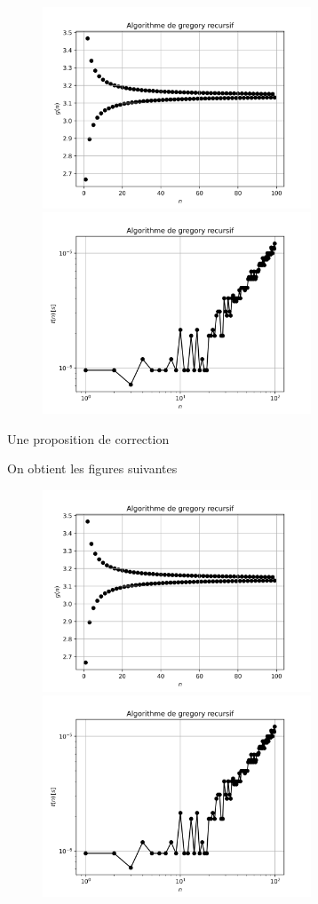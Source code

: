 \documentclass[a4paper,12pt]{article}
\begin{document}
\begin{figure}[htbp]
\includegraphics[width=8cm]{./2024/greg-val.png}
\includegraphics[width=8cm]{./2024/greg-tim.png}
\end{figure}
\clearpage
Une proposition de correction

\clearpage
On obtient les figures suivantes
\begin{figure}[htbp]
\includegraphics[width=8cm]{./2024/greg-val.png}
\includegraphics[width=8cm]{./2024/greg-tim.png}
\end{figure}
\end{document}
